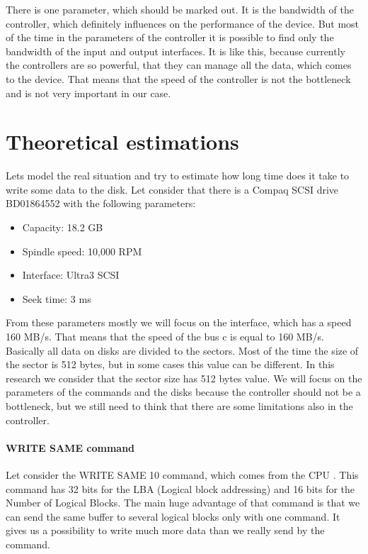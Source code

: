 There is one parameter, which should be marked out. It is the bandwidth of the controller, which definitely influences on the performance of the device. But most of the time in the parameters of the controller it is possible to find only the bandwidth of the input and output interfaces. It is like this, because currently the controllers are so powerful, that they can manage all the data, which comes to the device. That means that the speed of the controller is not the bottleneck and is not very important in our case.

\section{Theoretical estimations}
\label{sec:theory_est}

Lets model the real situation and try to estimate how long time does it take to write some data to the disk. Let consider that there is a Compaq SCSI drive BD01864552 with the following parameters: 
\begin{itemize}
	\setlength{\itemsep}{-2mm}
	\item Capacity: 18.2 GB
	\item Spindle speed: 10,000 RPM
	\item Interface: Ultra3 SCSI
	\item Seek time: 3 ms
\end{itemize}
From these parameters mostly we will focus on the interface, which has a speed 160 MB/s. That means that the speed of the bus c is equal to 160 MB/s. Basically all data on disks are divided to the sectors. Most of the time the size of the sector is 512 bytes, but in some cases this value can be different. In this research we consider that the sector size has 512 bytes value. We will focus on the parameters of the commands and the disks because the controller should not be a bottleneck, but we still need to think that there are some limitations also in the controller.

\paragraph{WRITE SAME command}
Let consider the WRITE SAME 10 command, which comes from the CPU \cite{scsi3_bc}. This command has 32 bits for the LBA (Logical block addressing) and 16 bits for the Number of Logical Blocks. The main huge advantage of that command is that we can send the same buffer to several logical blocks only with one command. It gives us a possibility to write much more data than we really send by the command.

